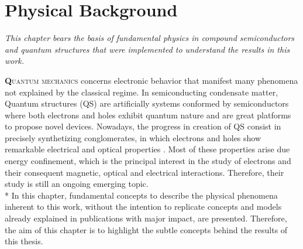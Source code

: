 \chapter{Physical Background }
\label{chap:Chapter-1}
\textit{This chapter bears the basis of fundamental physics in compound semiconductors and
quantum structures that were implemented to understand the results in this work.}
\vfill
\minitoc
\newpage

\lettrine[lines=3, lraise=.1, nindent=0mm, slope=0mm]{\textbf{Q}}{uantum mechanics}  concerns electronic behavior that manifest many phenomena not explained by the classical regime. In semiconducting condensate matter, Quantum structures (\gls{QS}) are artificially systems conformed by semiconductors where both electrons and holes exhibit quantum nature and are great platforms to propose novel devices. Nowadays, the progress in creation of \gls{QS} consist in precisely synthetizing conglomerates, in which electrons and holes show remarkable electrical and optical properties \cite{sundram1991structures,mcdonald2016dimensional}. Most of these properties arise due energy confinement, which is the principal interest in the study of electrons and their consequent magnetic, optical and electrical interactions. Therefore, their study is still an ongoing emerging topic\cite{argyropoulos2022asymmetric}.\\*
In this chapter, fundamental concepts to describe the physical phenomena inherent to this work, without the intention to replicate concepts and models already explained in publications with major impact, are presented. Therefore, the aim of this chapter is to highlight the subtle concepts behind the results of this thesis.

